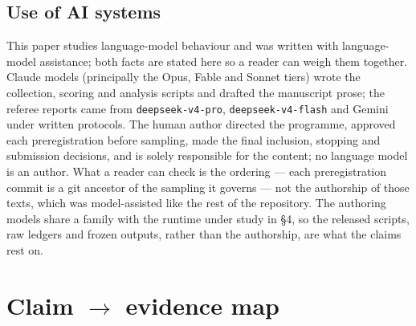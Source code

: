 \documentclass[11pt]{article}
\begin{document}
\subsection*{Use of AI systems}

This paper studies language-model behaviour and was written with language-model assistance; both
facts are stated here so a reader can weigh them together. Claude models (principally the Opus,
Fable and Sonnet tiers) wrote the collection, scoring and analysis scripts and drafted the
manuscript prose; the referee reports came from \texttt{deepseek-v4-pro}, \texttt{deepseek-v4-flash}
and Gemini under written protocols. The human author directed the programme, approved each
preregistration before sampling, made the final inclusion, stopping and submission decisions, and
is solely responsible for the content; no language model is an author. What a reader can check is
the ordering --- each preregistration commit is a git ancestor of the sampling it governs --- not
the authorship of those texts, which was model-assisted like the rest of the repository. The
authoring models share a family with the runtime under study in \S4, so the released scripts, raw
ledgers and frozen outputs, rather than the authorship, are what the claims rest on.

\section*{Claim $\rightarrow$ evidence map}
\end{document}
